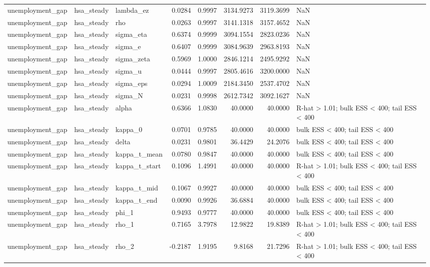 \begin{tabular}{lllrrrrl}
unemployment\_gap & hsa\_steady & lambda\_ez & 0.0284 & 0.9997 & 3134.9273 & 3119.3699 & NaN \\
unemployment\_gap & hsa\_steady & rho & 0.0263 & 0.9997 & 3141.1318 & 3157.4652 & NaN \\
unemployment\_gap & hsa\_steady & sigma\_eta & 0.6374 & 0.9999 & 3094.1554 & 2823.0236 & NaN \\
unemployment\_gap & hsa\_steady & sigma\_e & 0.6407 & 0.9999 & 3084.9639 & 2963.8193 & NaN \\
unemployment\_gap & hsa\_steady & sigma\_zeta & 0.5969 & 1.0000 & 2846.1214 & 2495.9292 & NaN \\
unemployment\_gap & hsa\_steady & sigma\_u & 0.0444 & 0.9997 & 2805.4616 & 3200.0000 & NaN \\
unemployment\_gap & hsa\_steady & sigma\_eps & 0.0294 & 1.0009 & 2184.3450 & 2537.4702 & NaN \\
unemployment\_gap & hsa\_steady & sigma\_N & 0.0231 & 0.9998 & 2612.7342 & 3092.1627 & NaN \\
unemployment\_gap & hsa\_steady & alpha & 0.6366 & 1.0830 & 40.0000 & 40.0000 & R-hat > 1.01; bulk ESS < 400; tail ESS < 400 \\
unemployment\_gap & hsa\_steady & kappa\_0 & 0.0701 & 0.9785 & 40.0000 & 40.0000 & bulk ESS < 400; tail ESS < 400 \\
unemployment\_gap & hsa\_steady & delta & 0.0231 & 0.9801 & 36.4429 & 24.2076 & bulk ESS < 400; tail ESS < 400 \\
unemployment\_gap & hsa\_steady & kappa\_t\_mean & 0.0780 & 0.9847 & 40.0000 & 40.0000 & bulk ESS < 400; tail ESS < 400 \\
unemployment\_gap & hsa\_steady & kappa\_t\_start & 0.1096 & 1.4991 & 40.0000 & 40.0000 & R-hat > 1.01; bulk ESS < 400; tail ESS < 400 \\
unemployment\_gap & hsa\_steady & kappa\_t\_mid & 0.1067 & 0.9927 & 40.0000 & 40.0000 & bulk ESS < 400; tail ESS < 400 \\
unemployment\_gap & hsa\_steady & kappa\_t\_end & 0.0090 & 0.9926 & 36.6884 & 40.0000 & bulk ESS < 400; tail ESS < 400 \\
unemployment\_gap & hsa\_steady & phi\_1 & 0.9493 & 0.9777 & 40.0000 & 40.0000 & bulk ESS < 400; tail ESS < 400 \\
unemployment\_gap & hsa\_steady & rho\_1 & 0.7165 & 3.7978 & 12.9822 & 19.8389 & R-hat > 1.01; bulk ESS < 400; tail ESS < 400 \\
unemployment\_gap & hsa\_steady & rho\_2 & -0.2187 & 1.9195 & 9.8168 & 21.7296 & R-hat > 1.01; bulk ESS < 400; tail ESS < 400 \\

\end{tabular}
